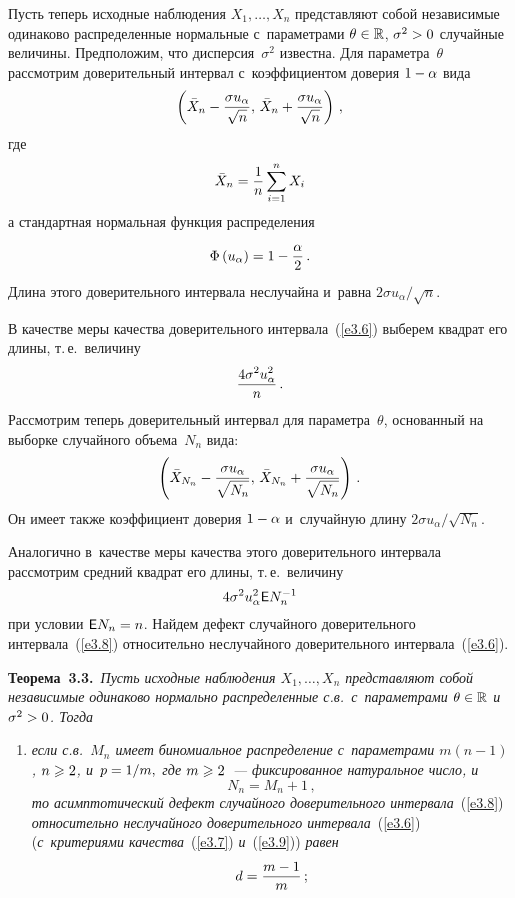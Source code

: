 \begin{multicols}{2}
Пусть теперь исходные наблюдения $X_1,\ldots,X_n$ представляют собой независимые 
одинаково распределенные нормальные с~па\-ра\-мет\-ра\-ми $\theta\hm \in \mathbb{R}$,
$\sigma^2\hm > 0$ случайные величины. Предположим, что дисперсия~$\sigma^2$ известна.
Для параметра~$\theta$ рас\-смот\-рим доверительный интервал с~коэффициентом 
доверия $1\hm - \alpha$ вида
\begin{equation}
\left(\bar X_n - \displaystyle\frac{\displaystyle \sigma u_\alpha\mathstrut}{\displaystyle \sqrt n\mathstrut},\, 
\bar X_n + \displaystyle\frac{\displaystyle \sigma u_\alpha\mathstrut}{\displaystyle \sqrt n\mathstrut}\right)\,,
\label{e3.6}
\end{equation}
где
$$
\bar X_n = \displaystyle\frac{\displaystyle 1\mathstrut}{\displaystyle n\mathstrut} \sum\limits_{i=1}^n X_i
$$
а стандартная нормальная функция распределения
$$
\Phi\left(u_\alpha\right) = 1 - \displaystyle\frac{\displaystyle \alpha\mathstrut}{\displaystyle 2\mathstrut}\,.
$$
Длина этого доверительного интервала неслучайна и~равна
${2\sigma u_\alpha}/{\sqrt n}$.

В качестве меры качества доверительного интервала~(\ref{e3.6}) 
выберем квадрат его длины, т.\,е.\ величину
\begin{equation}
\displaystyle\frac{\displaystyle 4\sigma^2 u_\alpha^2\mathstrut}{\displaystyle n\mathstrut}\,.
\label{e3.7}
\end{equation}
Рассмотрим теперь доверительный интервал для параметра~$\theta$, основанный 
на выборке случайного объема~$N_n$ вида:
\begin{equation}
\left(\bar X_{N_n} - \displaystyle\frac{\displaystyle \sigma u_\alpha\mathstrut}{\displaystyle \sqrt {N_n}\mathstrut},\, 
\bar X_{N_n} + \displaystyle\frac{\displaystyle \sigma u_\alpha\mathstrut}{\displaystyle \sqrt {N_n}\mathstrut}\right)\,.
\label{e3.8}
\end{equation}
Он имеет также коэффициент доверия $1\hm - \alpha$ и~случайную длину
${2\sigma u_\alpha}/{\sqrt {N_n}}$.

Аналогично в~качестве меры качества этого 
доверительного интервала рассмотрим средний квадрат его длины, т.\,е.\ величину
\begin{equation}
4\sigma^2 u_\alpha^2 {\sf E} N_n^{-1}\label{e3.9}
\end{equation}
при условии ${\sf E} N_n\hm = n$.
Найдем дефект случайного доверительного интервала~(\ref{e3.8}) 
относительно неслучайного доверительного интервала~(\ref{e3.6}).

\smallskip

\noindent
\textbf{Теорема~3.3.}\
\textit{Пусть исходные наблюдения $X_1,\ldots,X_n$ представляют собой независимые 
одинаково нормально распределенные с.в.\ с~параметрами 
$\theta\hm \in \mathbb{R}$ и~$\sigma^2\hm > 0$. Тогда}
\begin{enumerate}[(1)]
\item \textit{если с.в.~$M_n$ имеет биномиальное распределение 
с~параметрами $m(n-1)$, $n\hm \geqslant 2$, 
и~$p\hm = 1/m,$ где $m\hm \geqslant 2$~--- фиксированное натуральное число, и}
$$
N_n = M_n + 1\,,
$$
\textit{то асимптотический дефект случайного доверительного интервала}~(\ref{e3.8}) 
\textit{относительно неслучайного доверительного интервала}~(\ref{e3.6}) 
(\textit{с~критериями качества}~(\ref{e3.7}) \textit{и}~(\ref{e3.9})) \textit{равен}
$$
d = \displaystyle\frac{\displaystyle m - 1\mathstrut}{\displaystyle m\mathstrut}\,;
$$


\end{enumerate}
\end{multicols}
